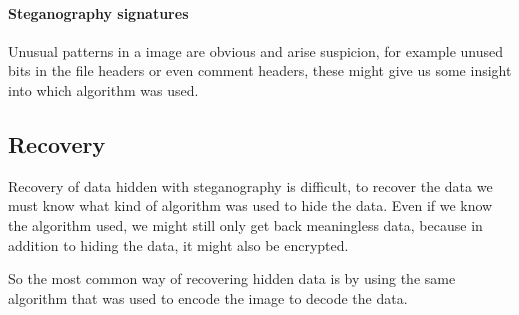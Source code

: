 \paragraph*{Steganography signatures}
Unusual patterns in a image are obvious and arise suspicion, for example unused bits in the file headers or even comment headers, these might give us some insight into which algorithm was used.

\subsection{Recovery}
Recovery of data hidden with steganography is difficult, to recover the data we must know what kind of algorithm was used to hide the data.
Even if we know the algorithm used, we might still only get back meaningless data, because in addition to hiding the data, it might also be encrypted.

So the most common way of recovering hidden data is by using the same algorithm that was used to encode the image to decode the data.
